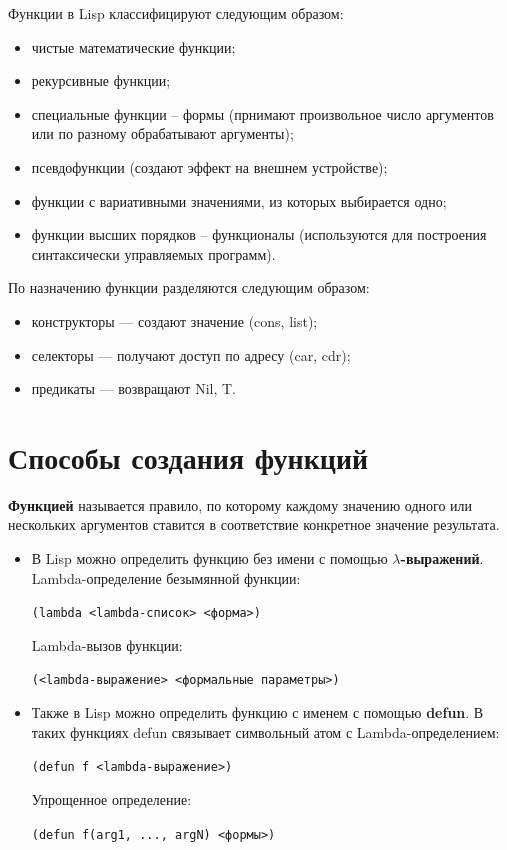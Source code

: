\documentclass[a4paper,14pt, unknownkeysallowed]{extreport}
\begin{document}
Функции в Lisp классифицируют следующим образом:

\begin{itemize}
	\item чистые математические функции;
	\item рекурсивные функции;
	\item специальные функции -- формы (прнимают произвольное число аргументов или по разному обрабатывают аргументы);
	\item псевдофункции (создают эффект на внешнем устройстве);
	\item функции с вариативными значениями, из которых выбирается одно;
	\item функции высших порядков -- функционалы (используются для построения синтаксически управляемых программ).
\end{itemize}

По назначению функции разделяются следующим образом:

\begin{itemize}
	\item конструкторы — создают значение (cons, list);
	\item селекторы — получают доступ по адресу (car, cdr); 
	\item предикаты — возвращают Nil, T.
\end{itemize}

\section{Способы создания функций}

\textbf{Функцией} называется правило, по которому каждому значению одного или нескольких аргументов ставится в соответствие конкретное значение результата.

\begin{itemize}
	\item В Lisp можно определить функцию без имени с помощью \textbf{$\lambda$-выражений}. 
	Lambda-определение безымянной функции:
	
	\begin{center}
	\texttt{(lambda <lambda-список> <форма>)}
	\end{center}

	Lambda-вызов функции:

	\begin{center}
	\texttt{(<lambda-выражение> <формальные параметры>)}
	\end{center}

	\item Также в Lisp можно определить функцию с именем с помощью \textbf{defun}. В таких функциях defun связывает символьный атом с Lambda-определением:
	
	\begin{center}
	\texttt{(defun f <lambda-выражение>)}
	\end{center}

	Упрощенное определение:

	\begin{center}
	\texttt{(defun f(arg1, ..., argN) <формы>)}
	\end{center}

\end{itemize}
\end{document}
